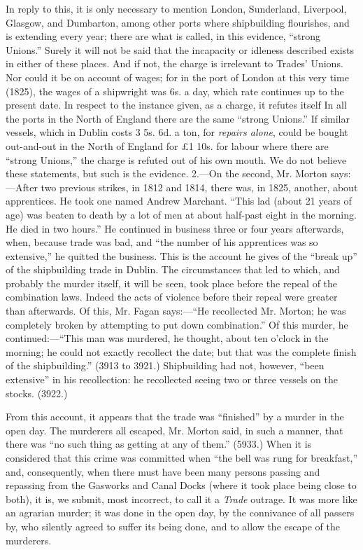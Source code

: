 In reply to this, it is only necessary to mention London, Sunderland,
Liverpool, Glasgow, and Dumbarton, among other ports where shipbuilding
flourishes, and is extending every year; there are what is called, in
this evidence, ``strong Unions.'' Surely it will not be said that the
incapacity or idleness described exists in either of these places. And
if not, the charge is irrelevant to Trades' Unions. Nor could it be on
account of wages; for in the port of London at this very time (1825),
the wages of a shipwright was 6s. a day, which rate continues up to the
present date. In respect to the instance given, as a charge, it refutes
itself In all the ports in the North of England there are the same
``strong Unions.'' If similar vessels, which in Dublin costs 3 5s. 6d. a
ton, for \textit{repairs alone}, could be bought out-and-out in the
North of England for £1 10s. for labour where there are ``strong
Unions,'' the charge is refuted out of his own mouth. We do not believe
these statements, but such is the evidence. 2.---On the second, Mr.
Morton says:---After two previous strikes, in 1812 and 1814, there was,
in 1825, another, about apprentices. He took one named Andrew Marchant.
``This lad (about 21 years of age) was beaten to death by a lot of men
at about half-past eight in the morning. He died in two hours.'' He
continued in business three or four years afterwards, when, because
trade was bad, and ``the number of his apprentices was so extensive,''
he quitted the business. This is the account he gives of the ``break
up'' of the shipbuilding trade in Dublin. The circumstances that led to
which, and probably the murder itself, it will be seen, took place
before the repeal of the combination laws. Indeed the acts of violence
before their repeal were greater than afterwards. Of this, Mr. Fagan
says:---``He recollected Mr. Morton; he was completely broken by
attempting to put down combination.'' Of this murder, he
continued:---``This man was murdered, he thought, about ten o'clock in
the morning; he could not exactly recollect the date; but that was the
complete finish of the shipbuilding.'' (3913 to 3921.) Shipbuilding had
not, however, ``been extensive'' in his recollection: he recollected
seeing two or three vessels on the stocks. (3922.)

From this account, it appears that the trade was ``finished'' by a
murder in the open day. The murderers all escaped, Mr. Morton said, in
such a manner, that there was ``no such thing as getting at any of
them.'' (5933.) When it is considered that this crime was committed when
``the bell was rung for breakfast,'' and, consequently, when there must
have been many persons passing and repassing from the Gasworks and Canal
Docks (where it took place being close to both), it is, we submit, most
incorrect, to call it a \textit{Trade} outrage. It was more like an
agrarian murder; it was done in the open day, by the connivance of all
passers by, who silently agreed to suffer its being done, and to allow
the escape of the murderers.

